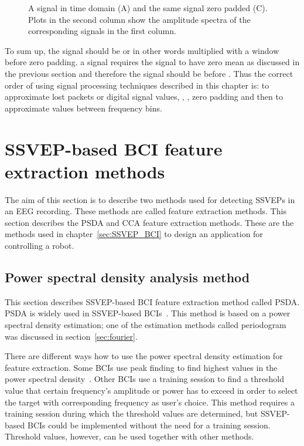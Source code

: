 \begin{figure}[h!]
	
	\caption{A signal in time domain (A) and the same signal zero padded (C). Plots in the second column show the amplitude spectra of the corresponding signals in the first column.}
	\label{fig:zero_padding}
\end{figure}

To sum up, the signal should be  or in other words multiplied with a \gls{window} before \gls{zero padding}.  a signal requires the signal to have zero \gls{mean} as discussed in the previous section and therefore the signal should be  before . Thus the correct order of using signal processing techniques described in this chapter is:  to approximate lost packets or \gls{digital signal} values, , , \gls{zero padding} and then  to approximate values between \glspl{frequency bin}.

\section{SSVEP-based BCI feature extraction methods}
\label{sec:SSVEP_detection}
The aim of this section is to describe two methods used for detecting \glspl{SSVEP} in an \gls{EEG} recording. These methods are called \gls{feature extraction} methods. This section describes the \gls{PSDA} and \gls{CCA} \gls{feature extraction} methods. These are the methods used in chapter~\ref{sec:SSVEP_BCI} to design an application for controlling a robot. %

\subsection{Power spectral density analysis method}
\label{sec:PSDA}

This section describes \gls{SSVEP}-based \gls{BCI} \gls{feature extraction} method called \gls{PSDA}. \Gls{PSDA} is widely used in \gls{SSVEP}-based \glspl{BCI}~\cite{bin2009cca}. This method is based on a \gls{power spectral density} estimation; one of the estimation methods called \gls{periodogram} was discussed in section~\ref{sec:fourier}.

There are different ways how to use the \gls{power spectral density} estimation for \gls{feature extraction}. Some \glspl{BCI} use peak finding to find highest values in the \gls{power spectral density}~\cite{cca_lin}. Other \glspl{BCI} use a training session to find a threshold value that certain frequency's amplitude or power has to exceed in order to select the \gls{target} with corresponding frequency as user's choice. This method requires a training session during which the threshold values are determined, but \gls{SSVEP}-based \glspl{BCI} could be implemented without the need for a training session. Threshold values, however, can be used together with other methods. 


